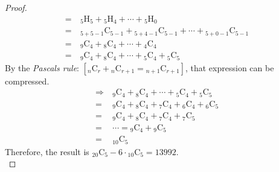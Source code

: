 \begin{proof}
\begin{align*}
			=\ & _{5}\mathrm{H}_{5} + {_{5}\mathrm{H}_{4}} + \cdots + {_{5}\mathrm{H}_{0}}\\
			=\ & _{5 + 5 - 1}\mathrm{C}_{5 - 1} + {_{5 + 4 - 1}\mathrm{C}_{5 - 1}} + \cdots + {_{5 + 0 - 1}\mathrm{C}_{5 - 1}}\\
			=\ & _{9}\mathrm{C}_{4} + {_{8}\mathrm{C}_{4}} + \cdots + {_{4}\mathrm{C}_{4}}\\
			=\ & _{9}\mathrm{C}_{4} + {_{8}\mathrm{C}_{4}} + \cdots + {_{5}\mathrm{C}_{4}} + {_{5}\mathrm{C}_{5}}
		\end{align*}
		By the \textit{Pascal\textquotesingle s rule}: $\left[{_{n}\mathrm{C}_{r}} + {_{n}\mathrm{C}_{r + 1}} = {_{n + 1}\mathrm{C}_{r + 1}}\right]$, that expression can be compressed.
		\begin{align*}
			\Rightarrow\ & _{9}\mathrm{C}_{4} + {_{8}\mathrm{C}_{4}} + \cdots + {_{5}\mathrm{C}_{4}} + {_{5}\mathrm{C}_{5}}\\
			=\ & _{9}\mathrm{C}_{4} + {_{8}\mathrm{C}_{4}} + {_{7}\mathrm{C}_{4}} + {_{6}\mathrm{C}_{4}} + {_{6}\mathrm{C}_{5}}\\
			=\ & _{9}\mathrm{C}_{4} + {_{8}\mathrm{C}_{4}} + {_{7}\mathrm{C}_{4}} + {_{7}\mathrm{C}_{5}}\\
			=\ & \cdots = {_{9}\mathrm{C}_{4}} + {_{9}\mathrm{C}_{5}}\\
			=\ & _{10}\mathrm{C}_{5}
		\end{align*}
		Therefore, the result is $_{20}\mathrm{C}_{5} - 6\cdot{_{10}\mathrm{C}_{5}} = 13992$.\\
	\end{proof}